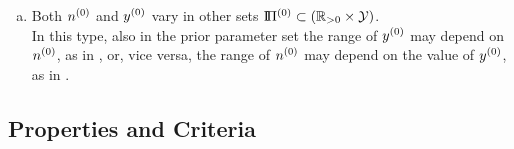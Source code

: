 \begin{enumerate}[(a)]
{but nevertheless follow the same update step.} %
We will discuss and illustrate this model in Section~\ref{sec:jstp}.
It should be noted here that while the prior parameter set is a Cartesian product of $\NZ = [\nzl, \nzu]$ and $\YZ$,
the posterior parameter set is not.
This is due to Eq.~\eqref{eq:canonicalupdate},
which results in different ranges for $\yn$ depending on the value of $\nz$ used in the update step.%
\footnote{This is illustrated, e.g., in Figure~\ref{fig:spot-banana}, page~\pageref{fig:spot-banana}.}
\item Both $\nz$ and $y^{(0)}$ vary in other sets $\text{I}\!\Pi^{(0)} \subset (\mathbb{R}_{>0} \times \mathcal{Y})$.\\
\label{enum:generalset}%
In this type, also in the prior parameter set the range of $y^{(0)}$ may depend on $\nz$,
as in \textcite[\S 2.3, see Section~\ref{sec:othershapes}]{Walter2011a},
or, vice versa, the range of $\nz$ may depend on the value of $y^{(0)}$, as in \textcite{2012:benavolizaffalon}.
\label{enum:modeltypes-d}
\end{enumerate}


\subsection{Properties and Criteria}
\label{sec:gbicp-properties-criteria}


